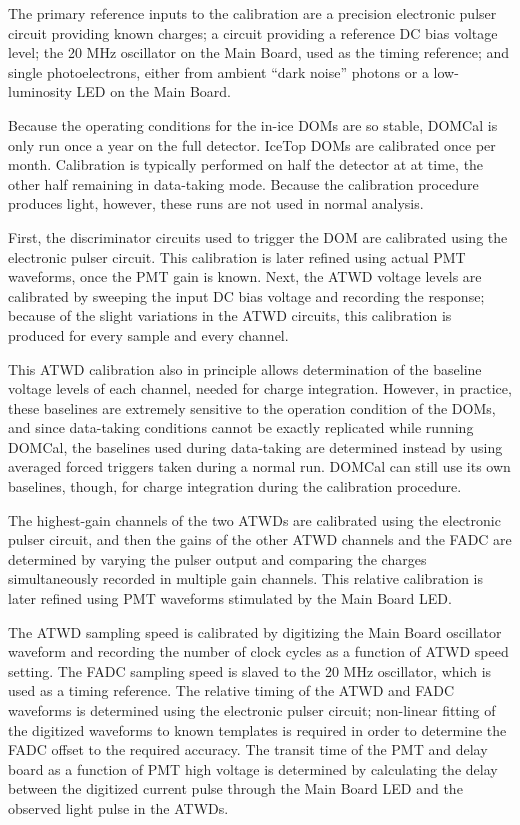 The primary reference inputs to the calibration are a precision electronic
pulser circuit providing known charges; a circuit providing a reference DC
bias voltage level; the 20 MHz oscillator on the Main
Board, used as the timing reference; and single photoelectrons, either from
ambient ``dark noise'' photons or a low-luminosity LED on the Main Board.

Because the operating conditions for
the in-ice DOMs are so stable, DOMCal is only run once a year on the full
detector. IceTop DOMs are calibrated once per month.  Calibration is
typically performed on half the detector at at time, the other half
remaining in data-taking mode.  Because the calibration procedure produces
light, however, these runs are not used in normal analysis.


First, the discriminator circuits used to trigger the DOM are calibrated
using the electronic pulser circuit.  This calibration is later refined using actual
PMT waveforms, once the PMT gain is known.  Next, the ATWD voltage levels
are calibrated by sweeping the input DC bias voltage and recording the
response; because of the slight variations in the ATWD circuits, this
calibration is produced for every sample and every channel.

This ATWD calibration also in principle allows determination of the baseline
voltage levels of each channel, needed for charge integration.  However, in
practice, these baselines are extremely sensitive to the operation
condition of the DOMs, and since data-taking conditions cannot be exactly
replicated while running DOMCal, the baselines used during data-taking are
determined instead by using averaged forced triggers taken during a normal
run.  DOMCal can still use its own baselines, though, for charge integration
during the calibration procedure.

The highest-gain channels of the two ATWDs are calibrated using the electronic
pulser circuit, and then the gains of the other ATWD channels and the FADC
are determined by varying the pulser output and comparing the charges
simultaneously recorded in multiple gain channels.  This relative
calibration is later refined using PMT waveforms stimulated by the Main
Board LED.

The ATWD sampling speed is calibrated by digitizing the Main Board oscillator
waveform and recording the number of clock cycles as a function of ATWD
speed setting.  The FADC sampling speed is slaved to the 20 MHz
oscillator, which is used as a timing reference.  The relative timing of
the ATWD and FADC waveforms is determined using the electronic pulser circuit;
non-linear fitting of the digitized waveforms to known templates is
required in order to determine the FADC offset to the required accuracy.
The transit time of the PMT and delay board as a function of PMT high
voltage is determined by calculating the delay between the digitized
current pulse through the Main Board LED and the observed light pulse in
the ATWDs.   


